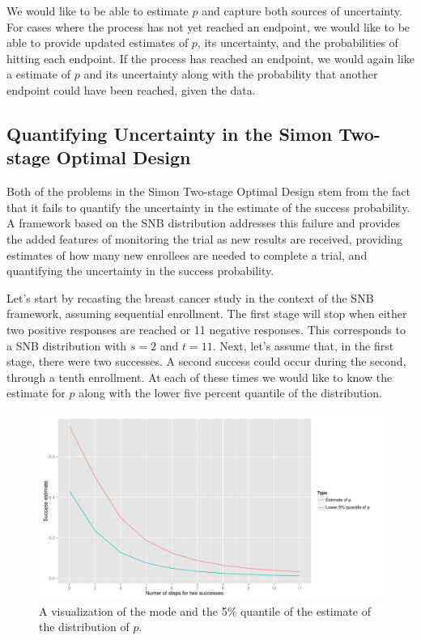 \documentclass[12pt]{article}         %
\begin{document}
We would like to be able to estimate $p$ and capture both sources of uncertainty. For cases where the process has not yet reached an endpoint, we would like to be able to provide updated estimates of $p$, its uncertainty, and the probabilities of hitting each endpoint. If the process has reached an endpoint, we would again like a estimate of $p$ and its uncertainty along with the probability that another endpoint could have been reached, given the data. 

\subsection{Quantifying Uncertainty in the Simon Two-stage Optimal Design}

Both of the problems in the Simon Two-stage Optimal Design stem from the fact that it fails to quantify the uncertainty in the estimate of the success probability. A framework based on the SNB distribution addresses this failure and 
provides the added features of monitoring the trial as new results are 
received, providing estimates of how many new enrollees are needed to complete 
a trial, and quantifying the uncertainty in the success probability.

Let's start by recasting the breast cancer study in the context of the SNB 
framework, assuming sequential enrollment. The first stage will stop when 
either two positive responses are reached or 11 negative responses. This 
corresponds to a SNB distribution with $s=2$ and $t=11$. Next, let's assume 
that, in the first stage, there were two successes. A second success could 
occur during the second, through a tenth enrollment. At each of these times we 
would like to know the estimate for $p$ along with the lower five percent 
quantile of the distribution. 

\begin{figure}[ht]
\includegraphics[width=\textwidth]{uncertainty.pdf}
\caption{
A visualization of the mode and the 5\% quantile of the estimate of the distribution of $p$.
}
\label{fig:simon}
\end{figure}
\end{document}

